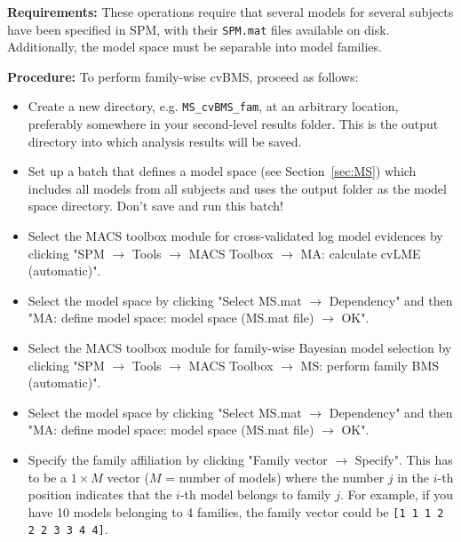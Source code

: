 \documentclass[a4paper,12pt]{article}
\newcommand{\ra}{$\rightarrow$ }
\begin{document}
\textbf{Requirements:} These operations require that several models for several subjects have been specified in SPM, with their \texttt{SPM.mat} files available on disk. Additionally, the model space must be separable into model families.

\textbf{Procedure:} To perform family-wise cvBMS, proceed as follows:
\begin{itemize}
	
\item
Create a new directory, e.g. \texttt{MS\_cvBMS\_fam}, at an arbitrary location, preferably somewhere in your second-level results folder. This is the output directory into which analysis results will be saved.

\item
Set up a batch that defines a model space (see Section~\ref{sec:MS}) which includes all models from all subjects and uses the output folder as the model space directory. Don't save and run this batch!

\item
Select the MACS toolbox module for cross-validated log model evidences by clicking \linebreak[4] "SPM \ra Tools \ra MACS Toolbox \ra MA: calculate cvLME (automatic)".

\item
Select the model space by clicking "Select MS.mat \ra Dependency" and then \linebreak[4] "MA: define model space: model space (MS.mat file) \ra OK".

\item
Select the MACS toolbox module for family-wise Bayesian model selection by clicking \linebreak[4] "SPM \ra Tools \ra MACS Toolbox \ra MS: perform family BMS (automatic)".

\item
Select the model space by clicking "Select MS.mat \ra Dependency" and then \linebreak[4] "MA: define model space: model space (MS.mat file) \ra OK".

\item
Specify the family affiliation by clicking "Family vector \ra Specify". This has to be a $1 \times M$ vector ($M$ = number of models) where the number $j$ in the $i$-th position indicates that the $i$-th model belongs to family $j$. For example, if you have 10 models belonging to 4 families, the family vector could be \texttt{[1 1 1 2 2 2 3 3 4 4]}.


\end{itemize}
\end{document}
